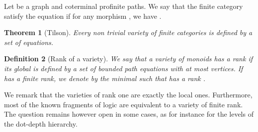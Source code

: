 \documentclass[submission,hidelink]{dmtcs-episciences}
\newtheorem{theorem}{Theorem}
\newtheorem{definition}[theorem]{Definition}
\begin{document}
Let  be a graph and  coterminal profinite paths.
			We say that the finite category  satisfy the equation  if for any morphism
			, we have .
\begin{theorem}[Tilson]
			Every non trivial variety of finite categories is defined by a set of equations. \end{theorem}
		\begin{definition}[Rank of a variety]\label{def:rank}
			We say that a variety of monoids  has a rank   if its global is defined by a set of bounded path
			equations with at most  vertices. If  has a finite rank, we denote by
			 the minimal  such that  has a rank .
		\end{definition}
		We remark that the varieties of rank one are exactly the local ones.
		Furthermore, most of the known fragments of logic are equivalent to a variety of finite rank. The question remains however
		open in some cases, as for instance for the levels of the dot-depth hierarchy.
\end{document}
